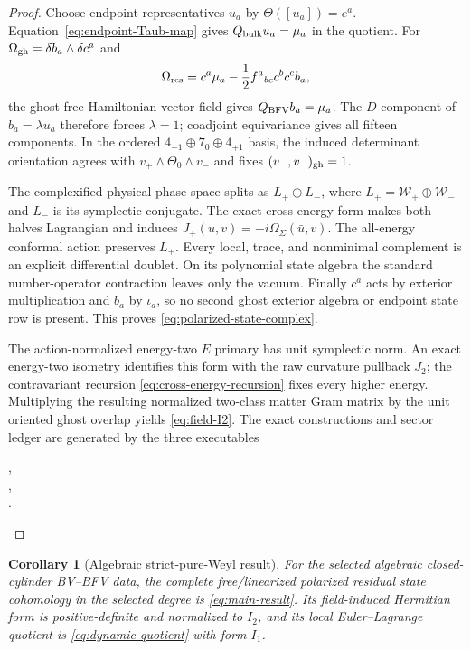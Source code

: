 \documentclass[11pt]{article}
\newtheorem{corollary}[theorem]{Corollary}
\theoremstyle{definition}
\theoremstyle{remark}
\newcommand{\W}{\mathcal W}
\begin{document}
\begin{proof}
Choose endpoint representatives $u_a$ by
$\Theta([u_a])=e^a$.  Equation~\eqref{eq:endpoint-Taub-map} gives
$Q_{\rm bulk}u_a=\mu_a$ in the quotient.  For
$\Omega_{\rm gh}=\delta b_a\wedge\delta c^a$ and
\begin{equation}
 \Omega_{\rm res}=c^a\mu_a-\frac12f^a{}_{bc}c^bc^cb_a,
\end{equation}
the ghost-free Hamiltonian vector field gives $Q_{\rm BFV}b_a=\mu_a$.
The $D$ component of $b_a=\lambda u_a$ therefore forces $\lambda=1$;
coadjoint equivariance gives all fifteen components.  In the ordered
$4_{-1}\oplus7_0\oplus4_{+1}$ basis, the induced determinant orientation
agrees with $v_+\wedge\Theta_0\wedge v_-$ and fixes
$(v_-,v_-)_{\rm gh}=1$.

The complexified physical phase space splits as
$L_+\oplus L_-$, where $L_+=\W_+\oplus\W_-$ and $L_-$ is its symplectic
conjugate.  The exact cross-energy form makes both halves Lagrangian and
induces $J_+(u,v)=-i\Omega_\Sigma(\bar u,v)$.  The all-energy conformal
action preserves $L_+$.  Every local, trace, and nonminimal complement is an
explicit differential doublet.  On its polynomial state algebra the standard
number-operator contraction leaves only the vacuum.  Finally $c^a$ acts by
exterior multiplication and $b_a$ by $\iota_a$, so no second ghost exterior
algebra or endpoint state row is present.  This proves
\eqref{eq:polarized-state-complex}.

The action-normalized energy-two $E$ primary has unit symplectic norm.  An
exact energy-two isometry identifies this form with the raw curvature
pullback $J_2$; the contravariant recursion
\eqref{eq:cross-energy-recursion} fixes every higher energy.  Multiplying the
resulting normalized two-class matter Gram matrix by the unit oriented ghost
overlap yields \eqref{eq:field-I2}.  The exact constructions and sector
ledger are generated by the three executables
\begin{center}\small
{},\\
,\\
.
\end{center}
\end{proof}

\begin{corollary}[Algebraic strict-pure-Weyl result]
\label{cor:algebraic-pure-weyl}
For the selected algebraic closed-cylinder BV--BFV data, the complete
free/linearized polarized residual state cohomology in the selected degree is
\eqref{eq:main-result}.  Its field-induced Hermitian form is positive-definite
and normalized to $I_2$, and its
local Euler--Lagrange quotient is \eqref{eq:dynamic-quotient} with form
$I_1$.
\end{corollary}
\end{document}

